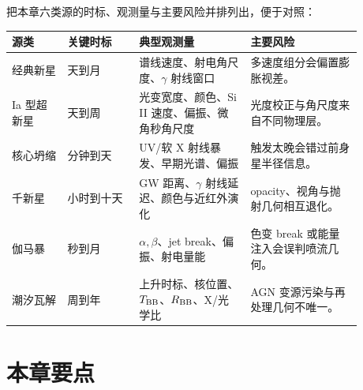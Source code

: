 把本章六类源的时标、观测量与主要风险并排列出，便于对照：
\begin{longtable}{@{}p{0.14\linewidth}p{0.18\linewidth}p{0.28\linewidth}p{0.28\linewidth}@{}}
\toprule
源类 & 关键时标 & 典型观测量 & 主要风险 \\
\midrule
经典新星 & 天到月 & 谱线速度、射电角尺度、\(\gamma\) 射线窗口 & 多速度组分会偏置膨胀视差。 \\
Ia 型超新星 & 天到周 & 光变宽度、颜色、Si\,II 速度、偏振、微角秒角尺度 & 光度校正与角尺度来自不同物理层。 \\
核心坍缩 & 分钟到天 & UV/软 X 射线暴发、早期光谱、偏振 & 触发太晚会错过前身星半径信息。 \\
千新星 & 小时到十天 & GW 距离、\(\gamma\) 射线延迟、颜色与近红外演化 & opacity、视角与抛射几何相互退化。 \\
伽马暴 & 秒到月 & \(\alpha,\beta\)、jet break、偏振、射电量能 & 色变 break 或能量注入会误判喷流几何。 \\
潮汐瓦解 & 周到年 & 上升时标、核位置、\(T_{\rm BB}\)、\(R_{\rm BB}\)、X/光学比 & AGN 变源污染与再处理几何不唯一。 \\
\bottomrule
\end{longtable}

\section*{本章要点}

